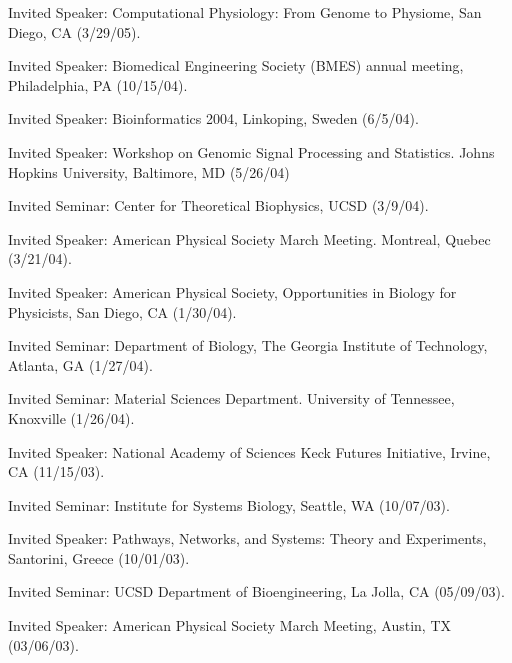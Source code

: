 \item Invited Speaker: Computational Physiology: From Genome to Physiome, San Diego,
CA (3/29/05).

\item Invited Speaker: Biomedical Engineering Society (BMES) annual meeting, Philadelphia, PA (10/15/04).

\item Invited Speaker: Bioinformatics 2004, Linkoping, Sweden (6/5/04).

\item Invited Speaker: Workshop on Genomic Signal Processing and Statistics.  Johns Hopkins University, Baltimore,
MD (5/26/04)

\item Invited Seminar: Center for Theoretical Biophysics, UCSD (3/9/04).

\item Invited Speaker: American Physical Society March Meeting.  Montreal, Quebec
(3/21/04).

\item Invited Speaker: American Physical Society, Opportunities in
Biology for Physicists, San Diego, CA (1/30/04).

\item Invited Seminar: Department of Biology, The Georgia Institute of Technology,
Atlanta, GA (1/27/04).

\item Invited Seminar: Material Sciences Department. University of Tennessee, Knoxville (1/26/04).

\item Invited Speaker: National Academy of Sciences Keck Futures Initiative, Irvine, CA (11/15/03).

\item Invited Seminar: Institute for Systems Biology, Seattle,
WA (10/07/03).

\item Invited Speaker: Pathways, Networks, and Systems:
Theory and Experiments, Santorini, Greece (10/01/03).

\item Invited Seminar: UCSD Department of Bioengineering,
La Jolla, CA (05/09/03).

\item  Invited Speaker: American Physical Society March
Meeting, Austin, TX (03/06/03).

